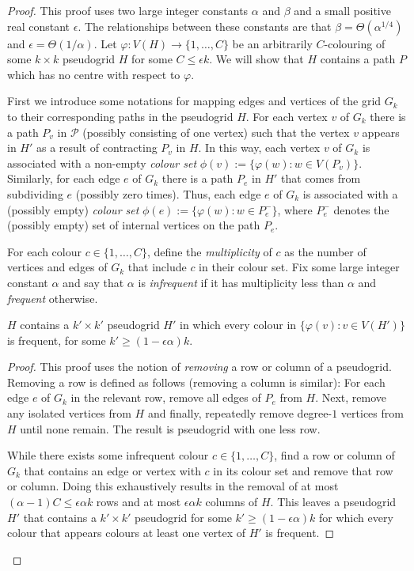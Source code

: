 \documentclass{patmorin}
\begin{document}
\begin{proof}
  This proof uses two large integer constants $\alpha$ and $\beta$ and a small positive real constant $\epsilon$.  The relationships between these constants are that $\beta = \Theta(\alpha^{1/4})$ and $\epsilon=\Theta(1/\alpha)$.  Let $\varphi:V(H)\to\{1,\ldots,C\}$ be an arbitrarily $C$-colouring of some $k\times k$ pseudogrid $H$ for some $C\le \epsilon k$.  We will show that $H$ contains a path $P$ which has no centre with respect to $\varphi$.

  First we introduce some notations for mapping edges and vertices of the grid $G_k$ to their corresponding paths in the pseudogrid $H$.  For each vertex $v$ of $G_k$ there is a path $P_v$ in $\mathcal{P}$ (possibly consisting of one vertex) such that the vertex $v$ appears in $H'$ as a result of contracting $P_v$ in $H$.  In this way, each vertex $v$ of $G_k$ is associated with a non-empty \emph{colour set} $\phi(v):=\{\varphi(w):w\in V(P_v)\}$.  Similarly, for each edge $e$ of $G_k$ there is a path $P_e$ in $H'$ that comes from subdividing $e$ (possibly zero times).  Thus, each edge $e$ of $G_k$ is associated with a (possibly empty) \emph{colour set} $\phi(e):=\{\varphi(w):w\in P^-_e\}$, where $P^-_e$ denotes the (possibly empty) set of internal vertices on the path $P_e$.

  For each colour $c\in\{1,\ldots,C\}$, define the \emph{multiplicity} of $c$ as the number of vertices and edges of $G_k$ that include $c$ in their colour set.  Fix some large integer constant $\alpha$ and say that $\alpha$ is \emph{infrequent} if it has multiplicity less than $\alpha$ and \emph{frequent} otherwise.

  \begin{clm}\label{all_frequent}
    $H$ contains a $k'\times k'$ pseudogrid $H'$ in which every colour in $\{\varphi(v):v\in V(H')\}$ is frequent, for some $k'\ge (1-\epsilon \alpha)k$.
  \end{clm}

  \begin{proof}
    This proof uses the notion of \emph{removing} a row or column of a pseudogrid.  Removing a row is defined as follows (removing a column is similar): For each edge $e$ of $G_k$ in the relevant row, remove all edges of $P_e$ from $H$. Next, remove any isolated vertices from $H$ and finally, repeatedly remove degree-$1$ vertices from $H$ until none remain.  The result is pseudogrid with one less row.

    While there exists some infrequent colour $c\in\{1,\ldots,C\}$, find a row or column of $G_k$ that contains an edge or vertex with $c$ in its colour set and remove that row or column.  Doing this exhaustively results in the removal of at most $(\alpha-1) C \le \epsilon\alpha k$ rows and at most $\epsilon\alpha k$ columns of $H$.  This leaves a pseudogrid $H'$ that contains a $k'\times k'$ pseudogrid for some $k'\ge (1-\epsilon \alpha)k$ for which every colour that appears colours at least one vertex of $H'$ is frequent.
  \end{proof}


\end{proof}
\end{document}
